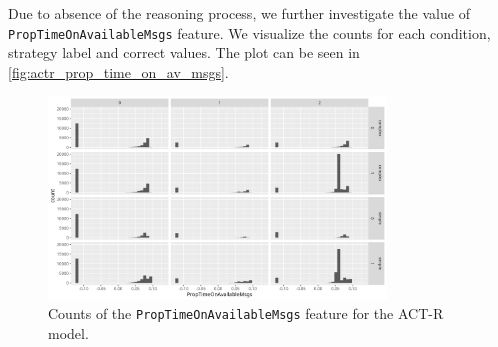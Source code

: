 Due to absence of the reasoning process, we further investigate the value of \texttt{PropTimeOnAvailableMsgs} feature. We visualize the counts for each condition, strategy label and correct values. The plot can be seen in \autoref{fig:actr_prop_time_on_av_msgs}. 

\begin{figure}
    \centering
    \includegraphics[width=0.8\textwidth]{images/sim_av_msgs_plot.png}
    \caption{Counts of the \texttt{PropTimeOnAvailableMsgs} feature for the ACT-R model.}
    \label{fig:actr_prop_time_on_av_msgs}
\end{figure}

